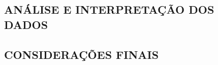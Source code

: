 \documentclass[
	article,			%
	11pt,				%
	oneside,			%
	a4paper,			%
	english,			%
	brazil,				%
	sumario=tradicional
	]{abntex2}
\begin{document}
\subsection{ANÁLISE E INTERPRETAÇÃO DOS DADOS}




% 

\subsection{CONSIDERAÇÕES FINAIS}

\postextual




%		
%		




%
%
\end{document}
